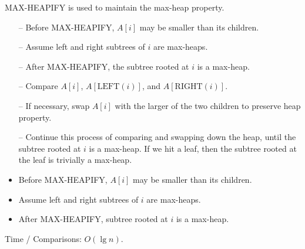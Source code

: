 \documentclass[12pt,openany]{book}
\theoremstyle{definition}
\begin{document}
	MAX-HEAPIFY is used to maintain the max-heap property.
	\begin{itemize}
		\item[--] Before MAX-HEAPIFY, \( A[i] \) may be smaller than its children.
		\item[--] Assume left and right subtrees of \( i \) are max-heaps.
		\item[--] After MAX-HEAPIFY, the subtree rooted at \( i \) is a max-heap.
		\item[--] Compare \( A[i] \), \( A[\text{LEFT}(i)] \), and \( A[\text{RIGHT}(i)] \).
		\item[--] If necessary, swap \( A[i] \) with the larger of the two children to preserve heap property.
		\item[--] Continue this process of comparing and swapping down the heap, until the subtree rooted at \( i \) is a max-heap. If we hit a leaf, then the subtree rooted at the leaf is trivially a max-heap.
	\end{itemize}
	\vspace{12pt}
	\begin{tcolorbox}
	\begin{itemize}
		\item Before MAX-HEAPIFY, \( A[i] \) may be smaller than its children.
		\item Assume left and right subtrees of \( i \) are max-heaps.
		\item After MAX-HEAPIFY, subtree rooted at \( i \) is a max-heap.\end{itemize}
	Time / Comparisons: \( O(\lg n) \).
	\end{tcolorbox}
\end{document}
